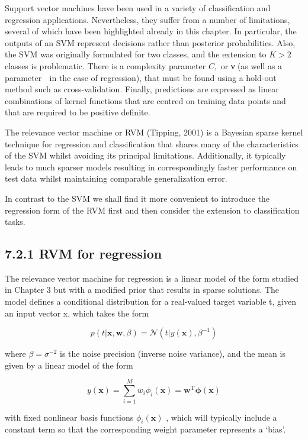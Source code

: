 \documentclass[
  10
]{article}
\begin{document}
Support vector machines have been used in a variety of classification
and regression applications. Nevertheless, they suffer from a number of
limitations, several of which have been highlighted already in this
chapter. In particular, the outputs of an SVM represent decisions rather
than posterior probabilities. Also, the SVM was originally formulated
for two classes, and the extension to \(K > 2\) classes is problematic.
There is a complexity parameter \(C ,\) or ν (as well as a parameter  in
the case of regression), that must be found using a hold-out method such
as cross-validation. Finally, predictions are expressed as linear
combinations of kernel functions that are centred on training data
points and that are required to be positive definite.

The relevance vector machine or RVM (Tipping, 2001) is a Bayesian sparse
kernel technique for regression and classification that shares many of
the characteristics of the SVM whilst avoiding its principal
limitations. Additionally, it typically leads to much sparser models
resulting in correspondingly faster performance on test data whilst
maintaining comparable generalization error.

In contrast to the SVM we shall find it more convenient to introduce the
regression form of the RVM first and then consider the extension to
classification tasks.

\subsection{7.2.1 RVM for regression}\label{rvm-for-regression}

The relevance vector machine for regression is a linear model of the
form studied in Chapter 3 but with a modified prior that results in
sparse solutions. The model defines a conditional distribution for a
real-valued target variable t, given an input vector x, which takes the
form

\[
p (t | \mathbf {x}, \mathbf {w}, \beta) = \mathcal {N} (t | y (\mathbf {x}), \beta^ {- 1})\tag{7.76}
\]

where \(\beta = \sigma ^ { - 2 }\) is the noise precision (inverse noise
variance), and the mean is given by a linear model of the form

\[
y (\mathbf {x}) = \sum_ {i = 1} ^ {M} w _ {i} \phi_ {i} (\mathbf {x}) = \mathbf {w} ^ {\mathrm{T}} \boldsymbol {\phi} (\mathbf {x})\tag{7.77}
\]

with fixed nonlinear basis functions \(\phi _ { i } ( \mathbf { x } )\)
, which will typically include a constant term so that the corresponding
weight parameter represents a `bias'.
\end{document}
